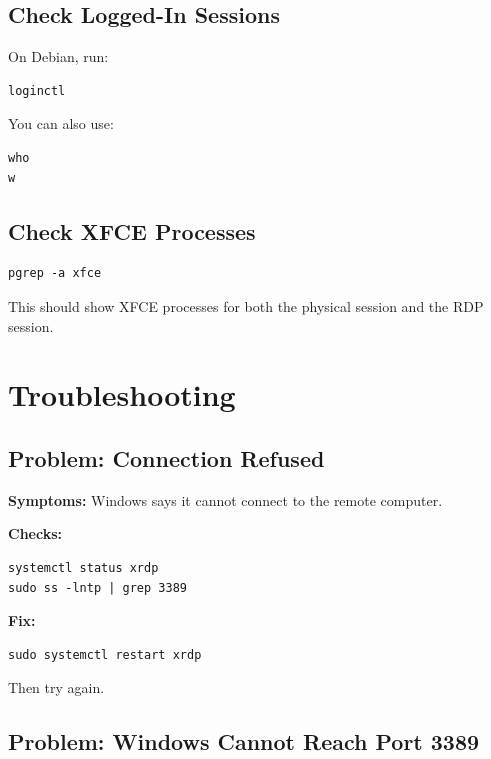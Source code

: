 \documentclass[a4paper,12pt]{article}
\begin{document}
\subsection{Check Logged-In Sessions}

On Debian, run:

\begin{lstlisting}[style=bashstyle]
loginctl
\end{lstlisting}

You can also use:

\begin{lstlisting}[style=bashstyle]
who
w
\end{lstlisting}

\subsection{Check XFCE Processes}

\begin{lstlisting}[style=bashstyle]
pgrep -a xfce
\end{lstlisting}

This should show XFCE processes for both the physical session and the RDP session.

\section{Troubleshooting}

\subsection{Problem: Connection Refused}

\textbf{Symptoms:} Windows says it cannot connect to the remote computer.

\textbf{Checks:}

\begin{lstlisting}[style=bashstyle]
systemctl status xrdp
sudo ss -lntp | grep 3389
\end{lstlisting}

\textbf{Fix:}

\begin{lstlisting}[style=bashstyle]
sudo systemctl restart xrdp
\end{lstlisting}

Then try again.

\subsection{Problem: Windows Cannot Reach Port 3389}
\end{document}
